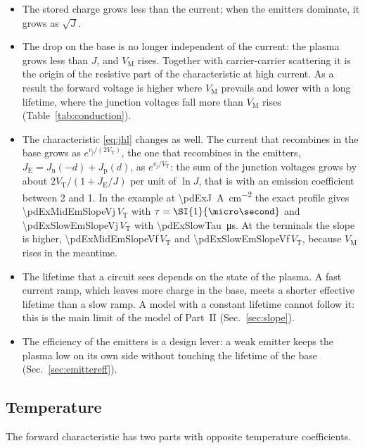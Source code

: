 \documentclass[10pt,a4paper]{scrartcl}
\newcommand{\vj}{v_\mathrm{j}}
\newcommand{\VT}{V_\mathrm{T}}
\newcommand{\Jn}{J_\mathrm{n}}
\newcommand{\Jp}{J_\mathrm{p}}
\newcommand{\VM}{V_\mathrm{M}}
\begin{document}
\begin{itemize}
\item The stored charge grows less than the current; when the emitters dominate, it grows as $\sqrt{J}$.
\item The drop on the base is no longer independent of the current: the plasma grows less than $J$, and $\VM$ rises. Together with carrier-carrier scattering it is the origin of the resistive part of the characteristic at high current. As a result the forward voltage is higher where $\VM$ prevails and lower with a long lifetime, where the junction voltages fall more than $\VM$ rises (Table~\ref{tab:conduction}).
\item The characteristic \eqref{eq:jhl} changes as well. The current that recombines in the base grows as $e^{\vj/(2\VT)}$, the one that recombines in the emitters, $J_\mathrm{E} = \Jn(-d) + \Jp(d)$, as $e^{\vj/\VT}$: the sum of the junction voltages grows by about $2\VT/(1 + J_\mathrm{E}/J)$ per unit of $\ln J$, that is with an emission coefficient between 2 and 1. In the example at \SI{\pdExJ}{\ampere\per\centi\metre\squared} the exact profile gives \num{\pdExMidEmSlopeVj}\,$\VT$ with $\tau = \SI{\pdExMidTau}{\micro\second}$ and \num{\pdExSlowEmSlopeVj}\,$\VT$ with \SI{\pdExSlowTau}{\micro\second}. At the terminals the slope is higher, \num{\pdExMidEmSlopeVf}\,$\VT$ and \num{\pdExSlowEmSlopeVf}\,$\VT$, because $\VM$ rises in the meantime.
\item The lifetime that a circuit sees depends on the state of the plasma. A fast current ramp, which leaves more charge in the base, meets a shorter effective lifetime than a slow ramp. A model with a constant lifetime cannot follow it: this is the main limit of the model of Part~II (Sec.~\ref{sec:slope}).
\item The efficiency of the emitters is a design lever: a weak emitter keeps the plasma low on its own side without touching the lifetime of the base (Sec.~\ref{sec:emittereff}).
\end{itemize}

\subsection{Temperature}
\label{sec:temperature}
The forward characteristic has two parts with opposite temperature coefficients.
\end{document}
